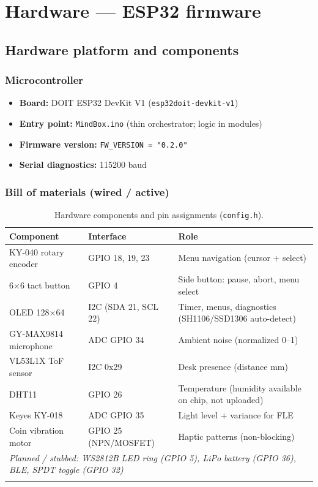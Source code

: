 \documentclass[11pt,a4paper]{report}
\newcommand{\filepath}[1]{\texttt{#1}}
\begin{document}
\part{Hardware --- ESP32 firmware}

\chapter{Hardware platform and components}

\section{Microcontroller}

\begin{itemize}[leftmargin=*]
  \item \textbf{Board:} DOIT ESP32 DevKit V1 (\filepath{esp32doit-devkit-v1})
  \item \textbf{Entry point:} \filepath{MindBox.ino} (thin orchestrator; logic in modules)
  \item \textbf{Firmware version:} \filepath{FW\_VERSION = "0.2.0"}
  \item \textbf{Serial diagnostics:} 115200 baud
\end{itemize}

\section{Bill of materials (wired / active)}

\begin{longtable}{@{}p{3.2cm}p{4.2cm}p{6.8cm}@{}}
\toprule
\textbf{Component} & \textbf{Interface} & \textbf{Role} \\
\midrule
\endhead
KY-040 rotary encoder & GPIO 18, 19, 23 & Menu navigation (cursor + select) \\
6$\times$6 tact button & GPIO 4 & Side button: pause, abort, menu select \\
OLED 128$\times$64 & I2C (SDA 21, SCL 22) & Timer, menus, diagnostics (SH1106/SSD1306 auto-detect) \\
GY-MAX9814 microphone & ADC GPIO 34 & Ambient noise (normalized 0--1) \\
VL53L1X ToF sensor & I2C 0x29 & Desk presence (distance mm) \\
DHT11 & GPIO 26 & Temperature (humidity available on chip, not uploaded) \\
Keyes KY-018 & ADC GPIO 35 & Light level + variance for FLE \\
Coin vibration motor & GPIO 25 (NPN/MOSFET) & Haptic patterns (non-blocking) \\
\midrule
\multicolumn{3}{l}{\textit{Planned / stubbed: WS2812B LED ring (GPIO 5), LiPo battery (GPIO 36), BLE, SPDT toggle (GPIO 32)}} \\
\bottomrule
\caption{Hardware components and pin assignments (\filepath{config.h}).}
\end{longtable}
\end{document}
